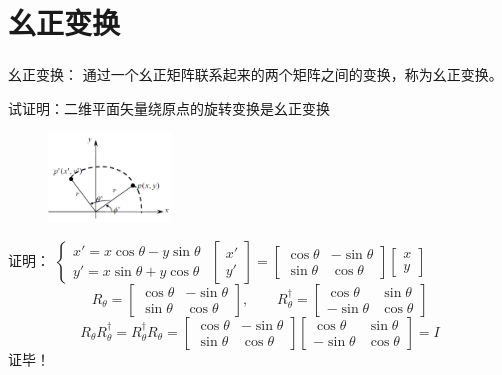 \section{幺正变换}
\begin{frame} 
    \frametitle{}
    \begin{tcolorbox1}{幺正变换：}
    通过一个幺正矩阵联系起来的两个矩阵之间的变换，称为幺正变换。
    \end{tcolorbox1}
    \begin{tcolorbox1}{}
        试证明：二维平面矢量绕原点的旋转变换是幺正变换
    \end{tcolorbox1}
    \begin{figure} %
        \includegraphics[width=0.29\textwidth]{figs/transf1.png}   
    \end{figure}
    \alert{证明：}
    $\left\{\begin{matrix}
        x'=x\cos\theta -y\sin\theta\\
        y'=x\sin\theta+y\cos\theta
    \end{matrix}\right.$ \qquad
    $\begin{bmatrix}
        x' \\
        y'
    \end{bmatrix}
    =
    \begin{bmatrix}
        \cos\theta & -\sin\theta\\
        \sin\theta & \cos\theta
    \end{bmatrix}
    \begin{bmatrix}
        x \\
        y
    \end{bmatrix}$\\
    $$ R_\theta=
    \begin{bmatrix}
        \cos\theta &-\sin\theta\\
        \sin\theta &\cos\theta
    \end{bmatrix} ,\qquad
    R_\theta ^{\dagger}=
    \begin{bmatrix}
        \cos\theta &\sin\theta\\
        -\sin\theta &\cos\theta
    \end{bmatrix} $$
    $$ R_\theta  R_\theta ^{\dagger} = R_\theta ^{\dagger} R_\theta=  
    \begin{bmatrix}
        \cos\theta &-\sin\theta\\
        \sin\theta &\cos\theta
    \end{bmatrix}
    \begin{bmatrix}
        \cos\theta &\sin\theta\\
        -\sin\theta &\cos\theta
    \end{bmatrix}
    =I
    $$
    证毕！
\end{frame}

